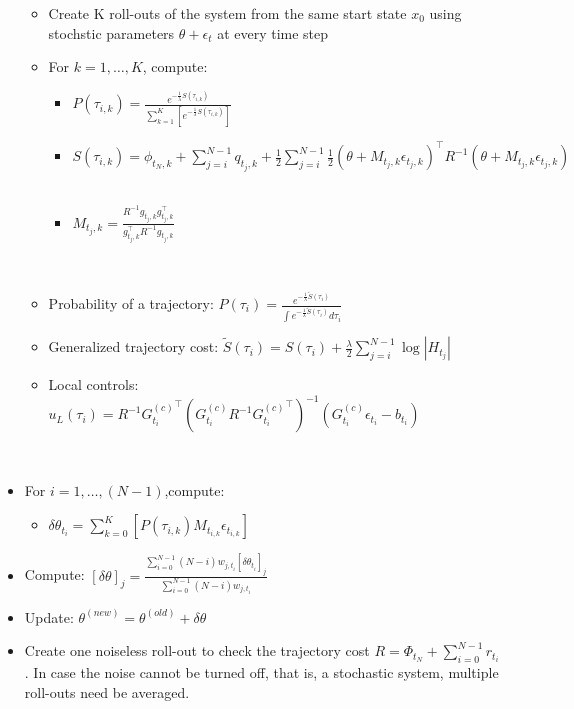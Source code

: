 \documentclass[journal]{IEEEtran}
\begin{document}
\begin{table}
\begin{itemize}
\begin{itemize}
       \item Create K roll-outs of the system from the same start state $x_0$ using stochstic parameters
       $\theta+ \epsilon_t$ at every time step
       \ \\
       \item For $k = 1 , \ldots,  K$, compute:
       \ \\
       \begin{itemize}
        \item 
            $P(\tau_{i,k}) = \frac{e^{-\frac{1}{\lambda}S(\tau_{i,k})}}{\sum_{k=1}^{K} [e^{-\frac{1}{\lambda}S(\tau_{i,k})}]}  $
        \ \\
        \item $S(\tau_{i,k}) = \phi_{t_N,k}+\sum_{j=i}^{N-1}q_{t_j,k}   + \frac{1}{2}\sum_{j=i}^{N-1}  \frac{1}{2}(\theta + M_{t_j,k}\epsilon_{t_j,k})^{\top}{R}^{-1} (\theta + M_{t_j,k}\epsilon_{t_j,k})$
        \ \\
        \item $M_{t_j, k} = \frac{R^{-1}g_{t_j, k}g_{t_j, k}^{\top}}{g_{t_j, k}^{\top}R^{-1}g_{t_j, k}}$
       \end{itemize}
       \ \\
       \item Probability of a trajectory: $P(\tau_i) = \frac{e^{-\frac{1}{\lambda}\tilde{S}(\tau_i)}  }{\int e^{-\frac{1}{\lambda}\tilde{S}(\tau_i)}d\tau_i}$ 
       \ \\
       \item Generalized trajectory cost: $\tilde{S}(\tau_i) = S(\tau_i) + \frac{\lambda}{2} \sum_{j = i}^{N-1} \log |H_{t_j}|$
        \ \\
       \item Local controls: $u_L(\tau_i) = R^{-1} {G_{t_i}^{(c)}}^{\top} ({G_{t_i}^{(c)}} R^{-1} {G_{t_i}^{(c)}}^{\top})^{-1}(G_{t_i}^{(c)}\epsilon_{t_i} - b_{t_i})$
     \end{itemize} 
     \ \\
     \item For $i=1, \ldots, (N-1)$,compute:
     \ \\ 
     \begin{itemize}
      \item  $\delta \theta_{t_i}  = \sum_{k=0}^{K}[ P(\tau_{i,k}) M_{t_{i,k}} \epsilon_{t_{i,k}}  ]$
      \ \\ 
     \end{itemize}
     \item Compute: $[\delta \theta ]_j =  \frac{\sum_{ i= 0}^{N-1}(N-i)w_{j, t_i}[\delta \theta_{t_i}]_j}{\sum_{ i= 0}^{N-1}(N-i)w_{j, t_i}}$
     \ \\
     \item Update: $ \theta^{(new)}  = \theta^{(old)} + \delta \theta$
     \ \\
     \item Create one noiseless roll-out to check the trajectory cost $R = \Phi_{t_N} +\sum_{i = 0}^{N -1} r_{t_i}$ . In case
     the noise cannot be turned off, that is, a stochastic system, multiple roll-outs need be averaged.
   \end{itemize}
 
 \end{table}
\end{document}

